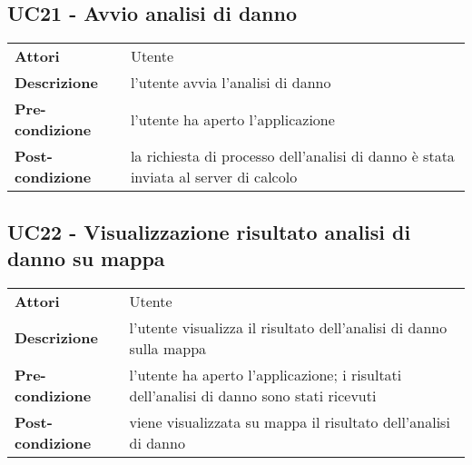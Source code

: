 \subsection{UC21 - Avvio analisi di danno}
\label{sssec:UC21}
\def\arraystretch{1.5}
\begin{tabularx}{\textwidth}{l|p{}}
\rowcolor{I} \multicolumn{2}{c}{\color{white}\textbf{UC21 - Avvio analisi di danno}} \\
\toprule
\endhead
\textbf{Attori} & Utente\\
\textbf{Descrizione} & l'utente avvia l'analisi di danno\\
\textbf{Pre-condizione} & l'utente ha aperto l'applicazione\\
\textbf{Post-condizione} & la richiesta di processo dell'analisi di danno è stata inviata al server di calcolo\\
\bottomrule
\end{tabularx}
\subsection{UC22 - Visualizzazione risultato analisi di danno su mappa}
\label{sssec:UC22}
\def\arraystretch{1.5}
\begin{tabularx}{\textwidth}{l|p{}}
\rowcolor{I} \multicolumn{2}{c}{\color{white}\textbf{UC22 - Visualizzazione risultato analisi di danno su mappa}} \\
\toprule
\endhead
\textbf{Attori} & Utente\\
\textbf{Descrizione} & l'utente visualizza il risultato dell'analisi di danno sulla mappa\\
\textbf{Pre-condizione} & l'utente ha aperto l'applicazione; i risultati dell'analisi di danno sono stati ricevuti\\
\textbf{Post-condizione} & viene visualizzata su mappa il risultato dell'analisi di danno\\
\bottomrule
\end{tabularx}
